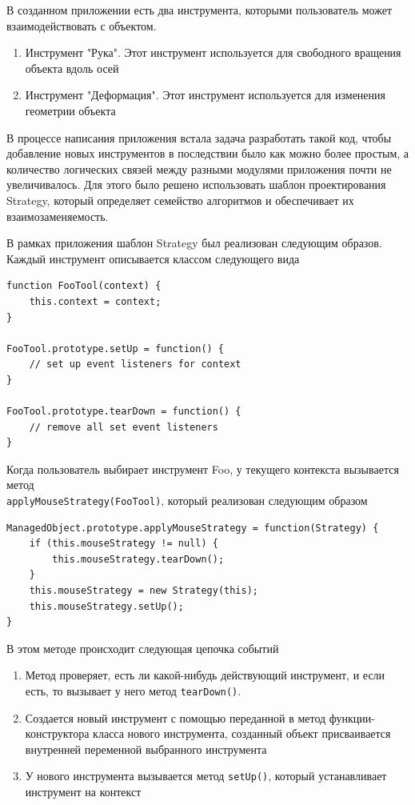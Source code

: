 \documentclass[12pt, a4paper]{article}
\begin{document}
В созданном приложении есть два инструмента, которыми пользователь может
взаимодействовать с объектом.
\begin{enumerate}
    \item Инструмент "Рука". Этот инструмент используется для свободного
    вращения объекта вдоль осей
    \item Инструмент "Деформация". Этот инструмент используется для изменения
    геометрии объекта
\end{enumerate}
В процессе написания приложения встала задача разработать такой код, чтобы
добавление новых инструментов в последствии было как можно более простым, а
количество логических связей между разными модулями приложения почти не
увеличивалось. Для этого было решено использовать шаблон проектирования
Strategy, который определяет семейство алгоритмов и обеспечивает их
взаимозаменяемость.

В рамках приложения шаблон Strategy был реализован следующим образов. Каждый
инструмент описывается классом следующего вида
\begin{lstlisting}
function FooTool(context) {
    this.context = context;
}

FooTool.prototype.setUp = function() {
    // set up event listeners for context
}

FooTool.prototype.tearDown = function() {
    // remove all set event listeners
}
\end{lstlisting}

Когда пользователь выбирает инструмент Foo, у текущего контекста вызывается метод \\
\texttt{applyMouseStrategy(FooTool)}, который реализован следующим образом
\begin{lstlisting}
ManagedObject.prototype.applyMouseStrategy = function(Strategy) {
    if (this.mouseStrategy != null) {
        this.mouseStrategy.tearDown();
    }
    this.mouseStrategy = new Strategy(this);
    this.mouseStrategy.setUp();
}
\end{lstlisting}

В этом методе происходит следующая цепочка событий
\begin{enumerate}
    \item Метод проверяет, есть ли какой-нибудь действующий инструмент, и если
    есть, то вызывает у него метод \texttt{tearDown()}.
    \item Создается новый инструмент с помощью переданной в метод
    функции-конструктора класса нового инструмента, созданный объект
    присваивается внутренней переменной выбранного инструмента
    \item У нового инструмента вызывается метод \texttt{setUp()}, который
    устанавливает инструмент на контекст
\end{enumerate}
\end{document}
